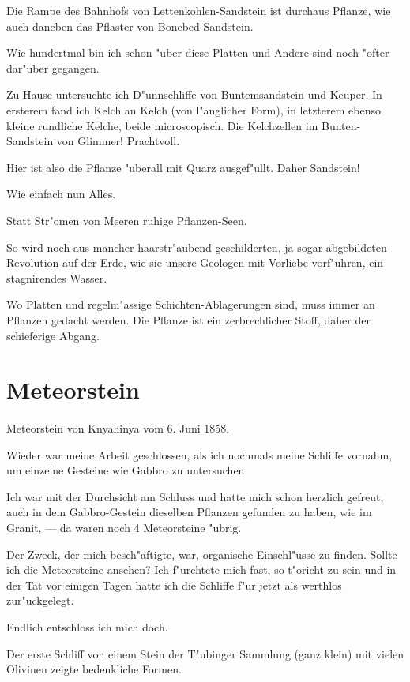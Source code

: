 \documentclass[a4paper, 11pt, oneside, german]{article}
\begin{document}
Die Rampe des Bahnhofs von Lettenkohlen-Sandstein ist durchaus Pflanze, wie auch daneben das Pflaster von Bonebed-Sandstein.

Wie hundertmal bin ich schon "uber diese Platten und Andere sind noch "ofter dar"uber gegangen.

Zu Hause untersuchte ich D"unnschliffe von Buntemsandstein und Keuper. In ersterem fand ich Kelch an Kelch (von l"anglicher Form), in letzterem ebenso kleine rundliche Kelche, beide microscopisch. Die Kelchzellen im Bunten-Sandstein von Glimmer! Prachtvoll.

Hier ist also die Pflanze "uberall mit Quarz ausgef"ullt. Daher Sandstein!

Wie einfach nun Alles.

Statt Str"omen von Meeren ruhige Pflanzen-Seen.

So wird noch aus mancher haarstr"aubend geschilderten, ja sogar abgebildeten Revolution auf der Erde, wie sie unsere Geologen mit Vorliebe vorf"uhren, ein stagnirendes Wasser.

Wo Platten und regelm"assige Schichten-Ablagerungen sind, muss immer an Pflanzen gedacht werden. Die Pflanze ist ein zerbrechlicher Stoff, daher der schieferige Abgang.
\clearpage
\section{Meteorstein}
\paragraph{}
Meteorstein von Knyahinya vom 6. Juni 1858.

Wieder war meine Arbeit geschlossen, als ich nochmals meine Schliffe vornahm, um einzelne Gesteine wie Gabbro zu untersuchen.

Ich war mit der Durchsicht am Schluss und hatte mich schon herzlich gefreut, auch in dem Gabbro-Gestein dieselben Pflanzen gefunden zu haben, wie im Granit, --- da waren noch 4 Meteorsteine "ubrig.

Der Zweck, der mich besch"aftigte, war, organische Einschl"usse zu finden. Sollte ich die Meteorsteine ansehen? Ich f"urchtete mich fast, so t"oricht zu sein und in der Tat vor einigen Tagen hatte ich die Schliffe f"ur jetzt als werthlos zur"uckgelegt.

Endlich entschloss ich mich doch.

Der erste Schliff von einem Stein der T"ubinger Sammlung (ganz klein) mit vielen Olivinen zeigte bedenkliche Formen.
\end{document}
